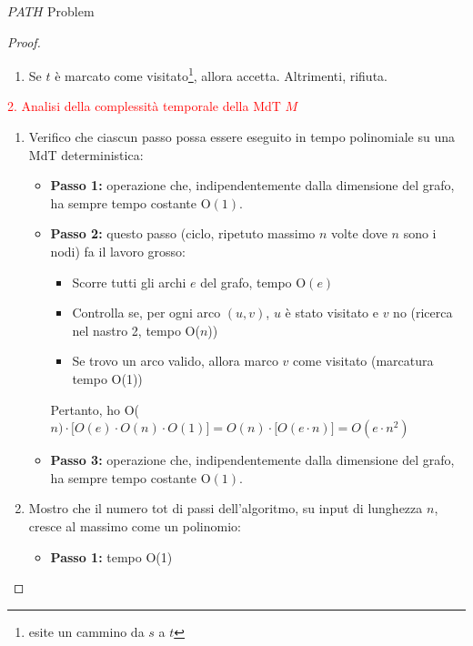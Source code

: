 \documentclass{article}  %
\theoremstyle{definition}
\begin{document}
\begin{theorem}{$PATH$ Problem}
\begin{proof}
\begin{enumerate}
{				      se alcuni nodi non sono raggiungibili da $s$, non verranno mai marcati — quindi il ciclo “finché tutti” non terminerebbe mai.}:
			      \begin{enumerate}
				      \item Scorri tutti gli archi del grafo $G$ sul nastro 1.
				      \item Se trovi un arco $(u,v)$ che va da un nodo $u$ già visitato a un nodo $v$ non visitato, allora marca $v$ sul nastro 2.
			      \end{enumerate}
			\item Se $t$ è marcato come visitato\footnote{esite un cammino da $s$ a $t$}, allora accetta. Altrimenti, rifiuta.
		\end{enumerate}
		\textcolor{red}{2. Analisi della complessità temporale della MdT $M$}
		\begin{enumerate}
			\item Verifico che ciascun passo possa essere eseguito in tempo polinomiale su una MdT deterministica:
			      \begin{itemize}
				      \item \textbf{Passo 1:} operazione che, indipendentemente dalla dimensione del grafo, ha sempre tempo costante O$(1)$.
				      \item \textbf{Passo 2:} questo passo (ciclo, ripetuto massimo $n$ volte dove $n$ sono i nodi) fa il lavoro grosso:
				            \begin{itemize}
					            \item Scorre tutti gli archi $e$ del grafo, tempo O$(e)$
					            \item Controlla se, per ogni arco $(u,v)$, $u$ è stato visitato e $v$ no (ricerca nel nastro 2, tempo O($n$))
					            \item Se trovo un arco valido, allora marco $v$ come visitato (marcatura tempo O(1))
				            \end{itemize}
				            Pertanto, ho O($n)\cdot \big[O(e)\cdot O(n)\cdot O(1)\big]=O(n)\cdot \big[O(e \cdot n)\big]=O(e \cdot n^2)$
				      \item \textbf{Passo 3:} operazione che, indipendentemente dalla dimensione del grafo, ha sempre tempo costante O$(1)$.
			      \end{itemize}
			\item Mostro che il numero tot di passi dell'algoritmo, su input di lunghezza $n$, cresce al massimo come un polinomio:
			      \begin{itemize}
				      \item \textbf{Passo 1:} tempo O(1)

\end{itemize}
\end{enumerate}
\end{proof}
\end{theorem}
\end{document}
